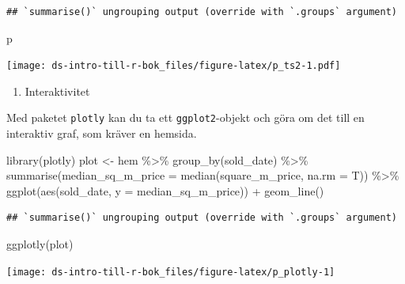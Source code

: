 \documentclass[
]{book}
\newenvironment{Shaded}{\begin{snugshade}}{\end{snugshade}}
\newcommand{\AttributeTok}[1]{\textcolor[rgb]{0.77,0.63,0.00}{#1}}
\newcommand{\FunctionTok}[1]{\textcolor[rgb]{0.00,0.00,0.00}{#1}}
\newcommand{\NormalTok}[1]{#1}
\newcommand{\OtherTok}[1]{\textcolor[rgb]{0.56,0.35,0.01}{#1}}
\newcommand{\SpecialCharTok}[1]{\textcolor[rgb]{0.00,0.00,0.00}{#1}}
\providecommand{\tightlist}{%
  \setlength{\itemsep}{0pt}\setlength{\parskip}{0pt}}
\begin{document}
\begin{verbatim}
## `summarise()` ungrouping output (override with `.groups` argument)
\end{verbatim}

\begin{Shaded}
\begin{Highlighting}[]
\NormalTok{p}
\end{Highlighting}
\end{Shaded}

\texttt{[image: ds-intro-till-r-bok\_files/figure-latex/p\_ts2-1.pdf]}

\begin{enumerate}
\def\labelenumi{\arabic{enumi}.}
\setcounter{enumi}{2}
\tightlist
\item
  Interaktivitet
\end{enumerate}

Med paketet \texttt{plotly} kan du ta ett \texttt{ggplot2}-objekt och göra om det till en interaktiv graf, som kräver en hemsida.

\begin{Shaded}
\begin{Highlighting}[]
\FunctionTok{library}\NormalTok{(plotly)}
\NormalTok{plot }\OtherTok{\textless{}{-}}\NormalTok{  hem }\SpecialCharTok{\%\textgreater{}\%} 
  \FunctionTok{group\_by}\NormalTok{(sold\_date) }\SpecialCharTok{\%\textgreater{}\%} 
  \FunctionTok{summarise}\NormalTok{(}\AttributeTok{median\_sq\_m\_price =} \FunctionTok{median}\NormalTok{(square\_m\_price, }\AttributeTok{na.rm =}\NormalTok{ T)) }\SpecialCharTok{\%\textgreater{}\%} 
  \FunctionTok{ggplot}\NormalTok{(}\FunctionTok{aes}\NormalTok{(sold\_date, }\AttributeTok{y =}\NormalTok{ median\_sq\_m\_price)) }\SpecialCharTok{+}
  \FunctionTok{geom\_line}\NormalTok{()}
\end{Highlighting}
\end{Shaded}

\begin{verbatim}
## `summarise()` ungrouping output (override with `.groups` argument)
\end{verbatim}

\begin{Shaded}
\begin{Highlighting}[]
\FunctionTok{ggplotly}\NormalTok{(plot)}
\end{Highlighting}
\end{Shaded}

\texttt{[image: ds-intro-till-r-bok\_files/figure-latex/p\_plotly-1]}
\end{document}
